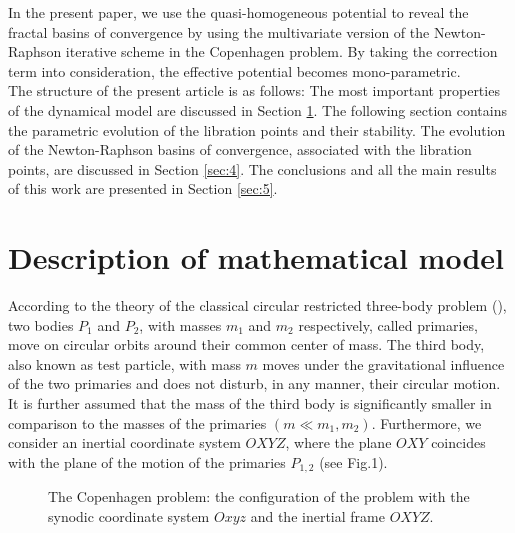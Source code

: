 \documentclass[preprint,fleqn,5p,numbers,sort&compress]{elsarticle}
\begin{document}
In the present paper, we use the quasi-homogeneous potential to reveal the fractal basins of convergence by using the multivariate version of the Newton-Raphson iterative scheme in the Copenhagen problem. By taking the correction term into consideration, the effective potential becomes mono-parametric.\\
The structure of the present article is as follows: The most important properties of the dynamical model are discussed in Section \ref{sec:2}. The following section contains the parametric evolution of the libration points and their stability. The evolution of the Newton-Raphson basins of convergence, associated with the libration points, are discussed in Section \ref{sec:4}. The conclusions and all the main results of this work are presented in Section \ref{sec:5}.
\section{Description of mathematical model}
\label{sec:2}
According to the theory of the classical circular restricted three-body problem (\cite{sze67}), two bodies $P_1$ and $P_2$, with masses $m_1$ and $m_2$ respectively, called primaries, move on circular orbits around their common center of mass. The third body, also known as test particle, with mass $m$ moves under the gravitational influence of the two primaries and does not disturb, in any manner, their circular motion. It is further assumed that the mass of the third body is significantly smaller in comparison to the masses of the primaries $(m \ll m_1, m_2)$. Furthermore, we consider an inertial coordinate system $OXYZ$, where the plane $OXY$ coincides with the plane of the motion of the primaries $P_{1,2}$ (see Fig.1).
\begin{figure}
\label{Fig01}
\begin{center}
\caption{The Copenhagen problem: the configuration of the problem with the synodic coordinate system $Oxyz$ and the inertial frame $OXYZ$.}
\end{center}
\end{figure}
\end{document}
